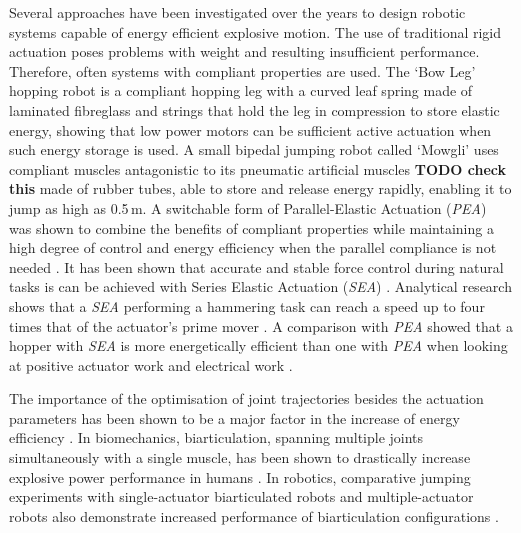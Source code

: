 \documentclass[letterpaper, 10 pt, conference]{ieeeconf}  %
\begin{document}
Several approaches have been investigated over the years to design robotic systems capable of energy efficient explosive motion. The use of traditional rigid actuation poses problems with weight and resulting insufficient performance. Therefore, often systems with compliant properties are used. The `Bow Leg' hopping robot \cite{zeglin1999bow} is a compliant hopping leg with a curved leaf spring made of laminated fibreglass and strings that hold the leg in compression to store elastic energy, showing that low power motors can be sufficient active actuation when such energy storage is used. A small bipedal jumping robot called `Mowgli' \cite{niiyama2007mowgli} uses compliant muscles antagonistic to its pneumatic artificial muscles \textbf{TODO check this} made of rubber tubes, able to store and release energy rapidly, enabling it to jump as high as 0.5\,m. A switchable form of Parallel-Elastic Actuation (\textit{PEA}) was shown to combine the benefits of compliant properties while maintaining a high degree of control and energy efficiency when the parallel compliance is not needed \cite{liu2015spear}. It has been shown that accurate and stable force control during natural tasks is can be achieved with Series Elastic Actuation (\textit{SEA}) \cite{pratt1995series}. Analytical research shows that a \textit{SEA} performing a hammering task can reach a speed up to four times that of the actuator’s prime mover \cite{garabini2011optimality}. A comparison with \textit{PEA} showed that a hopper with \textit{SEA} is more energetically efficient than one with \textit{PEA} when looking at positive actuator work and electrical work \cite{yesilevskiy2015comparison}.

The importance of the optimisation of joint trajectories besides the actuation parameters has been shown to be a major factor in the increase of energy efficiency \cite{velasco2013soft}. In biomechanics, biarticulation, spanning multiple joints simultaneously with a single muscle, has been shown to drastically increase explosive power performance in humans \cite{schenau1989rotation,prilutsky1994tendon}. In robotics, comparative jumping experiments with single-actuator biarticulated robots and multiple-actuator robots also demonstrate increased performance of biarticulation configurations \cite{oshima2007jumping,babivc2009biarticulated,hyon2002development}.
\end{document}
